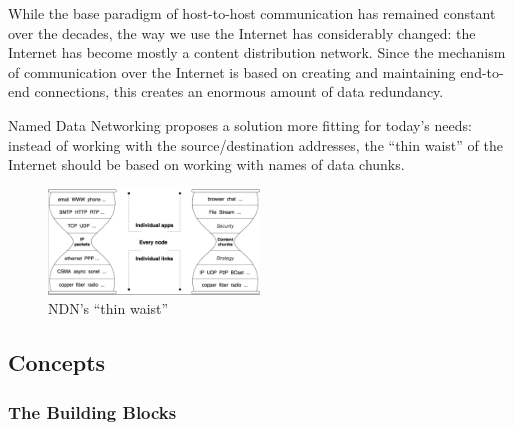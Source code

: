             While the base paradigm of host-to-host communication has remained constant over the decades, the way we use the Internet has considerably changed: the Internet has become mostly a content distribution network. Since the mechanism of communication over the Internet is based on creating and maintaining end-to-end connections, this creates an enormous amount of data redundancy.

            Named Data Networking proposes a solution more fitting for today's needs: instead of working with the source/destination addresses, the ``thin waist'' of the Internet should be based on working with names of data chunks.

            \begin{figure}[H]
                \begin{center}
                    \includegraphics[width=0.5\textwidth]{fig/archs_ndn-hourglass.png}
                  \caption{NDN's ``thin waist''}
                  \label{fig:ndn_waist}
                \end{center}
            \end{figure}

        \subsection{Concepts}

            \subsubsection{The Building Blocks}

